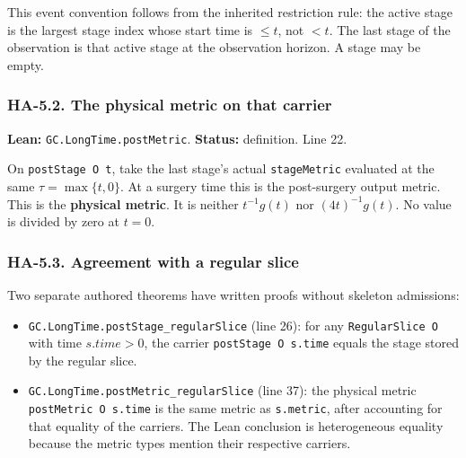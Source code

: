 \documentclass[
  letterpaper,
  11pt]{article}
\providecommand{\tightlist}{%
  \setlength{\itemsep}{0pt}\setlength{\parskip}{0pt}}
\begin{document}
This event convention follows from the inherited restriction rule: the
active stage is the largest stage index whose start time is \(\le t\),
not \(<t\). The last stage of the observation is that active stage at
the observation horizon. A stage may be empty.

\subsubsection{HA-5.2. The physical metric on that
carrier}\label{ha-5-2}

\textbf{Lean:}
{\small\texttt{GC.\allowbreak{}Long\allowbreak{}Time.\allowbreak{}post\allowbreak{}Metric}}.
\textbf{Status:} definition. Line 22.

On {\small\texttt{post\allowbreak{}Stage O t}}, take the last stage's
actual {\small\texttt{stage\allowbreak{}Metric}} evaluated at the same
\(\tau=\max\{t,0\}\). At a surgery time this is the post-surgery output
metric. This is the \textbf{physical metric}. It is neither
\(t^{-1}g(t)\) nor \((4t)^{-1}g(t)\). No value is divided by zero at
\(t=0\).

\subsubsection{HA-5.3. Agreement with a regular slice}\label{ha-5-3}

Two separate authored theorems have written proofs without skeleton
admissions:

\begin{itemize}
\tightlist
\item
  {\small\texttt{GC.\allowbreak{}Long\allowbreak{}Time.\allowbreak{}post\allowbreak{}Stage\_\allowbreak{}regular\allowbreak{}Slice}}
  (line 26): for any {\small\texttt{Regular\allowbreak{}Slice O}} with
  time \(s.time>0\), the carrier
  {\small\texttt{post\allowbreak{}Stage O s.\allowbreak{}time}} equals
  the stage stored by the regular slice.
\item
  {\small\texttt{GC.\allowbreak{}Long\allowbreak{}Time.\allowbreak{}post\allowbreak{}Metric\_\allowbreak{}regular\allowbreak{}Slice}}
  (line 37): the physical metric
  {\small\texttt{post\allowbreak{}Metric O s.\allowbreak{}time}} is the
  same metric as {\small\texttt{s.\allowbreak{}metric}}, after
  accounting for that equality of the carriers. The Lean conclusion is
  heterogeneous equality because the metric types mention their
  respective carriers.
\end{itemize}
\end{document}
